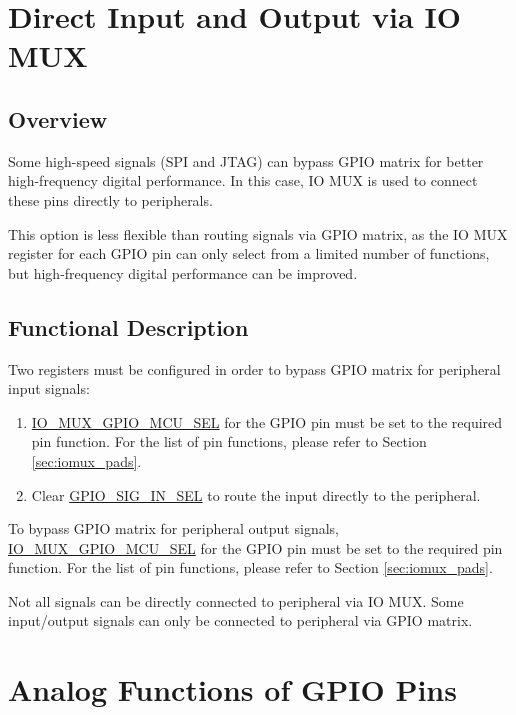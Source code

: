 \documentclass[main\_\_EN.tex]{subfiles}
\begin{document}
\section{Direct Input and Output via IO MUX}

\subsection{Overview}

Some high-speed signals (SPI and JTAG) can bypass GPIO matrix for better high-frequency digital performance. In this case, IO MUX is used to connect these pins directly to peripherals.

This option is less flexible than routing signals via GPIO matrix, as the IO MUX register for each GPIO pin can only select from a limited number of functions, but high-frequency digital performance can be improved.

\subsection{Functional Description}

Two registers must be configured in order to bypass GPIO matrix for peripheral input signals:

\begin{enumerate}
\item \hyperref[fielddesc:IOMUXGPIONMCUSEL]{IO\_MUX\_GPIO\_MCU\_SEL} for the GPIO pin must be set to the required pin function. For the list of pin functions, please refer to Section \ref{sec:iomux_pads}.
\item Clear \hyperref[fielddesc:GPIOSIGNINSEL]{GPIO\_SIG\_IN\_SEL} to route the input directly to the peripheral.
\end{enumerate}

To bypass GPIO matrix for peripheral output signals, \hyperref[fielddesc:IOMUXGPIONMCUSEL]{IO\_MUX\_GPIO\_MCU\_SEL} for the GPIO pin must be set to the required pin function. For the list of pin functions, please refer to Section \ref{sec:iomux_pads}.

\begin{tiplisting}
Not all signals can be directly connected to peripheral via IO MUX. Some input/output signals can only be connected to peripheral via GPIO matrix.
\end{tiplisting}

\section{Analog Functions of GPIO Pins}
\end{document}
